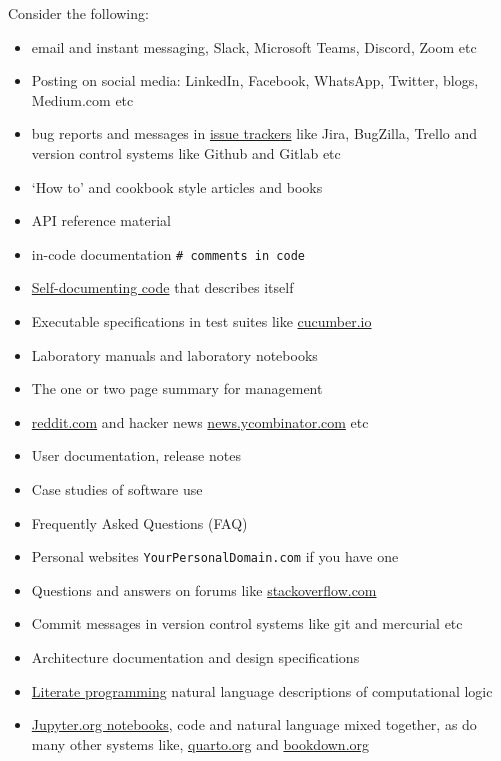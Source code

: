 \documentclass[
]{book}
\providecommand{\tightlist}{%
  \setlength{\itemsep}{0pt}\setlength{\parskip}{0pt}}
\begin{document}
Consider the following:

\begin{itemize}
\tightlist
\item
  email and instant messaging, Slack, Microsoft Teams, Discord, Zoom etc
\item
  Posting on social media: LinkedIn, Facebook, WhatsApp, Twitter, blogs, Medium.com etc
\item
  bug reports and messages in \href{https://en.wikipedia.org/wiki/Comparison_of_issue-tracking_systems}{issue trackers} like Jira, BugZilla, Trello and version control systems like Github and Gitlab etc
\item
  `How to' and cookbook style articles and books
\item
  API reference material
\item
  in-code documentation \texttt{\#\ comments\ in\ code}
\item
  \href{https://en.wikipedia.org/wiki/Self-documenting_code}{Self-documenting code} that describes itself
\item
  Executable specifications in test suites like \href{https://en.wikipedia.org/wiki/Cucumber_(software)}{cucumber.io}
\item
  Laboratory manuals and laboratory notebooks
\item
  The one or two page summary for management
\item
  \href{https://www.reddit.com/}{reddit.com} and hacker news \href{https://news.ycombinator.com/}{news.ycombinator.com} etc
\item
  User documentation, release notes
\item
  Case studies of software use
\item
  Frequently Asked Questions (FAQ)
\item
  Personal websites \texttt{YourPersonalDomain.com} if you have one
\item
  Questions and answers on forums like \href{https://stackoverflow.com/}{stackoverflow.com}
\item
  Commit messages in version control systems like git and mercurial etc
\item
  Architecture documentation and design specifications
\item
  \href{https://en.wikipedia.org/wiki/Literate_programming}{Literate programming} natural language descriptions of computational logic \citep{knuthlit}
\item
  \href{https://jupyter.org/}{Jupyter.org notebooks}, code and natural language mixed together, as do many other systems like, \href{https://quarto.org/}{quarto.org} and \href{https://bookdown.org/}{bookdown.org}
\end{itemize}
\end{document}
